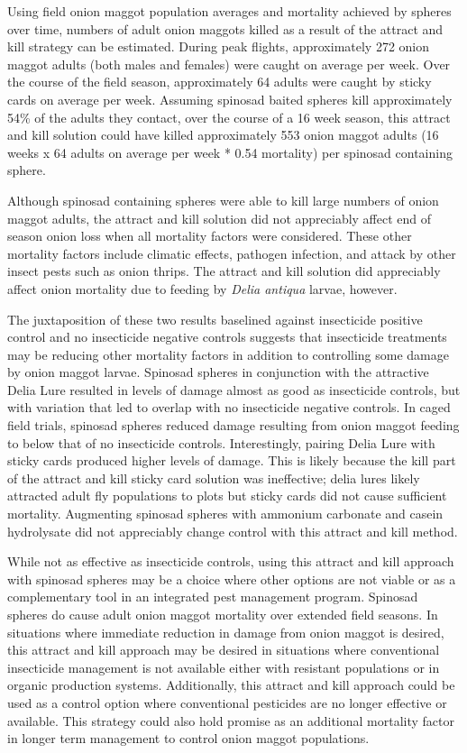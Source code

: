 \documentclass[alpha-refs]{wiley-article}
\begin{document}
Using field onion maggot population averages and mortality achieved by spheres over time, numbers of adult onion maggots killed as a result of the attract and kill strategy can be estimated. During peak flights, approximately 272 onion maggot adults (both males and females) were caught on average per week.  Over the course of the field season, approximately 64 adults were caught by sticky cards on average per week.  Assuming spinosad baited spheres kill approximately 54\% of the adults they contact, over the course of a 16 week season, this attract and kill solution could have killed approximately 553 onion maggot adults (16 weeks x 64 adults on average per week * 0.54 mortality) per spinosad containing sphere.  

Although spinosad containing spheres were able to kill large numbers of onion maggot adults, the attract and kill solution did not appreciably affect end of season onion loss when all mortality factors were considered.  These other mortality factors include climatic effects, pathogen infection, and attack by other insect pests such as onion thrips.  The attract and kill solution did appreciably affect onion mortality due to feeding by \textit{Delia antiqua} larvae, however.  

The juxtaposition of these two results baselined against insecticide positive control and no insecticide negative controls suggests that insecticide treatments may be reducing other mortality factors in addition to controlling some damage by onion maggot larvae.  Spinosad spheres in conjunction with the attractive Delia Lure resulted in levels of damage almost as good as insecticide controls, but with variation that led to overlap with no insecticide negative controls.  In caged field trials, spinosad spheres reduced damage resulting from onion maggot feeding to below that of no insecticide controls.  Interestingly, pairing Delia Lure with sticky cards produced higher levels of damage.  This is likely because the kill part of the attract and kill sticky card solution was ineffective; delia lures likely attracted adult fly populations to plots but sticky cards did not cause sufficient mortality.  Augmenting spinosad spheres with ammonium carbonate and casein hydrolysate did not appreciably change control with this attract and kill method.  

While not as effective as insecticide controls, using this attract and kill approach with spinosad spheres may be a choice where other options are not viable or as a complementary tool in an integrated pest management program.  Spinosad spheres do cause adult onion maggot mortality over extended field seasons.  In situations where immediate reduction in damage from onion maggot is desired, this attract and kill approach may be desired in situations where conventional insecticide management is not available either with resistant populations or in organic production systems.  Additionally, this attract and kill approach could be used as a control option where conventional pesticides are no longer effective or available. This strategy could also hold promise as an additional mortality factor in longer term management to control onion maggot populations.  
\end{document}
